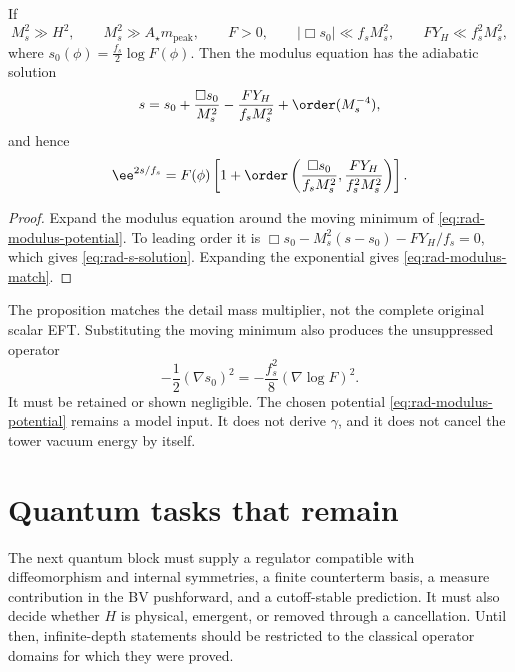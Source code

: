 \begin{proposition}
If
\begin{equation}
M_s^2\gg H^2,
\qquad
M_s^2\gg A_\star m_{\mathrm{peak}},
\qquad F>0,
\qquad
|\Box s_0|\ll f_sM_s^2,
\qquad
F Y_H\ll f_s^2M_s^2,
\label{eq:rad-heavy-conditions}
\end{equation}
where $s_0(\phi)=\tfrac{f_s}{2}\log F(\phi)$.  Then the modulus equation has the adiabatic solution
\begin{equation}
s=s_0
+\frac{\Box s_0}{M_s^2}
-\frac{FY_H}{f_sM_s^2}
+\order(M_s^{-4}),
\label{eq:rad-s-solution}
\end{equation}
and hence
\begin{equation}
\ee^{2s/f_s}
=F(\phi)
\left[
1+\order\left(\frac{\Box s_0}{f_sM_s^2},
\frac{FY_H}{f_s^2M_s^2}\right)
\right].
\label{eq:rad-modulus-match}
\end{equation}
\end{proposition}

\begin{proof}
Expand the modulus equation around the moving minimum of \eqref{eq:rad-modulus-potential}.  To leading order it is $\Box s_0-M_s^2(s-s_0)-FY_H/f_s=0$, which gives \eqref{eq:rad-s-solution}.  Expanding the exponential gives \eqref{eq:rad-modulus-match}.
\end{proof}

\begin{statusbox}
The proposition matches the detail mass multiplier, not the complete original scalar EFT.  Substituting the moving minimum also produces the unsuppressed operator
\begin{equation}
-\frac12(\nabla s_0)^2
=-\frac{f_s^2}{8}(\nabla\log F)^2.
\end{equation}
It must be retained or shown negligible.  The chosen potential \eqref{eq:rad-modulus-potential} remains a model input.  It does not derive $\gamma$, and it does not cancel the tower vacuum energy by itself.
\end{statusbox}

\section{Quantum tasks that remain}

The next quantum block must supply a regulator compatible with diffeomorphism and internal symmetries, a finite counterterm basis, a measure contribution in the BV pushforward, and a cutoff-stable prediction.  It must also decide whether $H$ is physical, emergent, or removed through a cancellation.  Until then, infinite-depth statements should be restricted to the classical operator domains for which they were proved.
